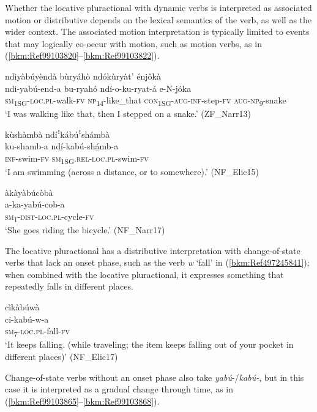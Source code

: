 Whether the locative pluractional with dynamic verbs is interpreted as associated motion or distributive depends on the lexical semantics of the verb, as well as the wider context. The associated motion interpretation is typically limited to events that may logically co-occur with motion, such as motion verbs, as in (\ref{bkm:Ref99103820}--\ref{bkm:Ref99103822}).

\ea
\label{bkm:Ref99103820}
ndìyàbúyèndà bùryáhò ndókùryàt’ énjôkà\\
\gll ndi-yabú-end-a    bu-ryahó ndí-o-ku-ryat-á    e-N-jóka\\
\textsc{sm}\textsubscript{1SG}-\textsc{loc}.\textsc{pl}-walk-\textsc{fv}  \textsc{np}\textsubscript{14}-like\_that
\textsc{con}\textsubscript{1SG}-\textsc{aug}-\textsc{inf}-step-\textsc{fv}  \textsc{aug}-\textsc{np}\textsubscript{9}-snake\\
\glt ‘I was walking like that, then I stepped on a snake.’ (ZF\_Narr13)
\z

\ea
kùshàmbà ndíꜝkábúꜝshámbà\\
\gll ku-shamb-a  ndí̲-kabú-shá̲mb-a\\
\textsc{inf}-swim-\textsc{fv}  \textsc{sm}\textsubscript{1SG}.\textsc{rel}-\textsc{loc}.\textsc{pl}-swim-\textsc{fv}\\
\glt ‘I am swimming (across a distance, or to somewhere).’ (NF\_Elic15)
\z

\ea
\label{bkm:Ref99103822}
\glll àkàyàbúcòbà\\
a-ka-yabú-cob-a\\
\textsc{sm}\textsubscript{1}-\textsc{dist}-\textsc{loc}.\textsc{pl}-cycle-\textsc{fv}\\
\glt ‘She goes riding the bicycle.’ (NF\_Narr17)
\z

The locative pluractional has a distributive interpretation with change-of-state verbs that lack an onset phase, such as the verb \textit{w} ‘fall’ in (\ref{bkm:Ref497245841}); when combined with the locative pluractional, it expresses something that repeatedly falls in different places.

\ea
\label{bkm:Ref497245841}
\glll cìkàbúwà\\
ci-kabú-w-a\\
\textsc{sm}\textsubscript{7}-\textsc{loc}.\textsc{pl}-fall-\textsc{fv}\\
\glt ‘It keeps falling. (while traveling; the item keeps falling out of your pocket in different places)’ (NF\_Elic17)
\z

Change-of-state verbs without an onset phase also take \textit{yabú}-/\textit{kabú-}, but in this case it is interpreted as a gradual change through time, as in (\ref{bkm:Ref99103865}--\ref{bkm:Ref99103868}).

